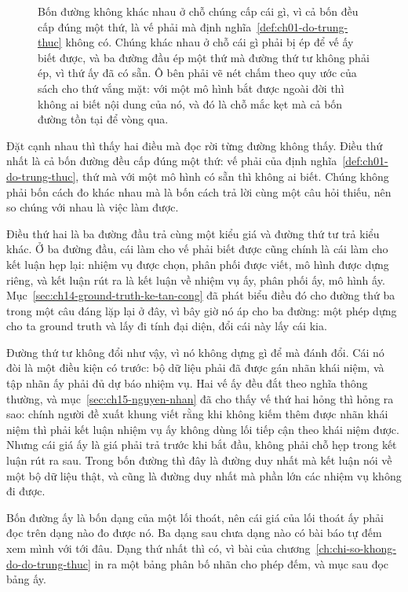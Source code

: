 \begin{figure}[htbp]
  \centering
  
  \caption{Bốn đường không khác nhau ở chỗ chúng cấp cái gì, vì cả bốn đều cấp
  đúng một thứ, là vế phải mà định nghĩa~\ref{def:ch01-do-trung-thuc} không có.
  Chúng khác nhau ở chỗ cái gì phải bị ép để vế ấy biết được, và ba đường đầu ép
  một thứ mà đường thứ tư không phải ép, vì thứ ấy đã có sẵn. Ô bên phải vẽ nét
  chấm theo quy ước của sách cho thứ vắng mặt: với một mô hình bắt được ngoài
  đời thì không ai biết nội dung của nó, và đó là chỗ mắc kẹt mà cả bốn đường
  tồn tại để vòng qua.}
  \label{fig:ch16-bon-duong-dung-san}
\end{figure}

%
Đặt cạnh nhau thì thấy hai điều mà đọc rời từng đường không thấy. Điều thứ nhất
là cả bốn đường đều cấp đúng một thứ: vế phải của định
nghĩa~\ref{def:ch01-do-trung-thuc}, thứ mà với một mô hình có sẵn thì không ai
biết. Chúng không phải bốn cách đo khác nhau mà là bốn cách trả lời cùng một câu
hỏi thiếu, nên so chúng với nhau là việc làm được.

Điều thứ hai là ba đường đầu trả cùng một kiểu giá và đường thứ tư trả kiểu
khác. Ở ba đường đầu, cái làm cho vế phải biết được cũng chính là cái làm cho
kết luận hẹp lại: nhiệm vụ được chọn, phân phối được viết, mô hình được dựng
riêng, và kết luận rút ra là kết luận về nhiệm vụ ấy, phân phối ấy, mô hình ấy.
Mục~\ref{sec:ch14-ground-truth-ke-tan-cong} đã phát biểu điều đó cho đường thứ
ba trong một câu đáng lặp lại ở đây, vì bây giờ nó áp cho ba đường: một phép dựng
cho ta ground truth và lấy đi tính đại diện, đổi cái này lấy cái kia.

%
Đường thứ tư không đổi như vậy, vì nó không dựng gì để mà đánh đổi. Cái nó đòi
là một điều kiện có trước: bộ dữ liệu phải đã được gán nhãn khái niệm, và tập
nhãn ấy phải đủ dự báo nhiệm vụ. Hai vế ấy đều đắt theo nghĩa thông thường, và
mục~\ref{sec:ch15-nguyen-nhan} đã cho thấy vế thứ hai hỏng thì hỏng ra sao:
chính người đề xuất khung viết rằng khi không kiếm thêm được nhãn khái niệm thì
phải kết luận nhiệm vụ ấy không dùng lối tiếp cận theo khái niệm được. Nhưng cái
giá ấy là giá phải trả trước khi bắt đầu, không phải chỗ hẹp trong kết luận rút
ra sau. Trong bốn đường thì đây là đường duy nhất mà kết luận nói về một bộ dữ
liệu thật, và cũng là đường duy nhất mà phần lớn các nhiệm vụ không đi được.

%
Bốn đường ấy là bốn dạng của một lối thoát, nên cái giá của lối thoát ấy phải
đọc trên dạng nào đo được nó. Ba dạng sau chưa dạng nào có bài báo tự đếm xem
mình với tới đâu. Dạng thứ nhất thì có, vì bài của
chương~\ref{ch:chi-so-khong-do-do-trung-thuc} in ra một bảng phân bố nhãn cho
phép đếm, và mục sau đọc bảng ấy.
